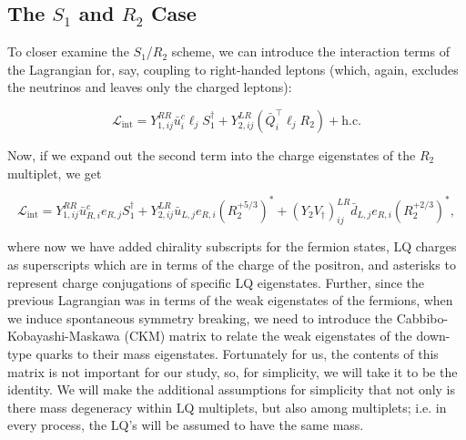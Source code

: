         \subsection{The \texorpdfstring{$S_1$ and $R_2$}{S1 and R2} Case}

            To closer examine the $S_1$/$R_2$ scheme, we can introduce the interaction terms of the Lagrangian for, say, coupling to right-handed leptons (which, again, excludes the neutrinos and leaves only the charged leptons):

            \begin{equation}
                \mathcal{L}_{\text{int}} = Y_{1,ij}^{RR} \bar{u}_i^c \ell_j S_1^{\dagger} + Y_{2,ij}^{LR} \left(\bar{Q}_i^{\intercal} \ell_j R_2\right) + \text{h.c.}
            \end{equation}

            Now, if we expand out the second term into the charge eigenstates of the $R_2$ multiplet, we get

            \begin{equation}
                \mathcal{L}_{\text{int}} = Y_{1,ij}^{RR} \bar{u}^c_{R,i} e_{R,j} S_1^{\dagger} + Y_{2,ij}^{LR} \bar{u}_{L,j} e_{R,i}  (R_2^{+5/3})^* + (Y_2 V_{\dagger})_{ij}^{LR}\bar{d}_{L,j} e_{R,i}  (R_2^{+2/3})^*,
            \end{equation}

            where now we have added chirality subscripts for the fermion states, LQ charges as superscripts which are in terms of the charge of the positron, and asterisks to represent charge conjugations of specific LQ eigenstates. Further, since the previous Lagrangian was in terms of the weak eigenstates of the fermions, when we induce spontaneous symmetry breaking, we need to introduce the Cabbibo-Kobayashi-Maskawa (CKM) matrix to relate the weak eigenstates of the down-type quarks to their mass eigenstates. Fortunately for us, the contents of this matrix is not important for our study, so, for simplicity, we will take it to be the identity. We will make the additional assumptions for simplicity that not only is there mass degeneracy within LQ multiplets, but also among multiplets; i.e. in every process, the LQ's will be assumed to have the same mass.



